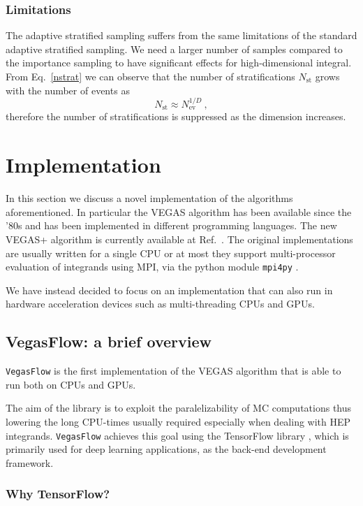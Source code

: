 \documentclass[../main/main.tex]{subfiles}
\begin{document}
\subsubsection{Limitations}
The adaptive stratified sampling suffers from the same limitations of the standard adaptive stratified sampling.
We need a larger number of samples compared to the importance sampling  to have significant effects for high-dimensional integral.
From Eq.~\ref{nstrat} we can observe that the number of stratifications $N_\text{st}$ grows with the number of events as 
\begin{equation}
	N_\text{st} \approx N_\text{ev}^{1/D} \ ,
\end{equation}
therefore the number of stratifications is suppressed as the dimension increases. 

\section{Implementation}
In this section we discuss a novel implementation of the algorithms aforementioned.
In particular the VEGAS algorithm has been available since the '80s and has been implemented in different programming languages.
The new VEGAS+ algorithm is currently available at Ref.~\cite{peter_lepage_2021_4746454}.
The original implementations are usually written for a single CPU or at most they support multi-processor evaluation of integrands using
MPI, via the python module \texttt{mpi4py} \cite{peter_lepage_2021_4746454}.

We have instead decided to focus on an implementation that can also run in hardware acceleration devices such as multi-threading CPUs and GPUs.

\subsection{VegasFlow: a brief overview}
\texttt{VegasFlow} \cite{vegasflow_package} is the first implementation of the VEGAS algorithm that is able to run both on CPUs and GPUs.
 
The aim of the library is to exploit the paralelizability of MC computations thus lowering the long CPU-times usually required especially when
dealing with HEP integrands.
 \texttt{VegasFlow} achieves this goal using the TensorFlow library \cite{tensorflow2015-whitepaper}, which is primarily used for deep learning applications, as the back-end development framework. 

\subsubsection{Why TensorFlow?}
\label{tensorflow}
\end{document}
